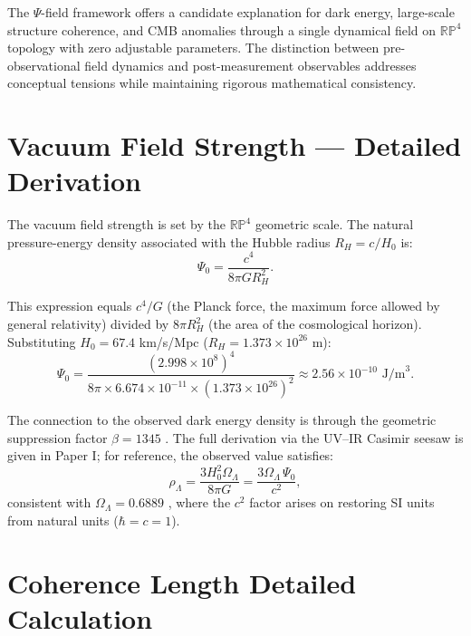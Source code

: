 The $\Psi$-field framework offers a candidate explanation for dark energy, large-scale structure coherence, and CMB anomalies through a single dynamical field on $\mathbb{RP}^4$ topology with zero adjustable parameters. The distinction between pre-observational field dynamics and post-measurement observables addresses conceptual tensions while maintaining rigorous mathematical consistency.


\clearpage



\clearpage

\appendix

\section{Vacuum Field Strength — Detailed Derivation}
\label{app:vacuum}

The vacuum field strength is set by the $\mathbb{RP}^4$ geometric scale. The natural pressure-energy density associated with the Hubble radius $R_H = c/H_0$ is:
\begin{equation}
\Psi_0 = \frac{c^4}{8\pi G R_H^2}.
\end{equation}

This expression equals $c^4/G$ (the Planck force, the maximum force allowed by general relativity) divided by $8\pi R_H^2$ (the area of the cosmological horizon). Substituting $H_0 = 67.4$ km/s/Mpc ($R_H = 1.373 \times 10^{26}$ m):
\begin{equation}
\Psi_0 = \frac{(2.998\times10^8)^4}{8\pi \times 6.674\times10^{-11} \times (1.373\times10^{26})^2} \approx 2.56 \times 10^{-10} \text{ J/m}^3.
\end{equation}

The connection to the observed dark energy density is through the geometric suppression factor $\beta = 1345$ \citep{Peacock2026a}. The full derivation via the UV--IR Casimir seesaw is given in Paper I; for reference, the observed value satisfies:
\begin{equation}
\rho_\Lambda = \frac{3H_0^2\Omega_\Lambda}{8\pi G} = \frac{3\Omega_\Lambda\,\Psi_0}{c^2},
\end{equation}
consistent with $\Omega_\Lambda = 0.6889$ \citep{Peacock2026a}, where the $c^2$ factor arises on restoring SI units from natural units ($\hbar=c=1$).

\section{Coherence Length Detailed Calculation}
\label{app:coherence}

